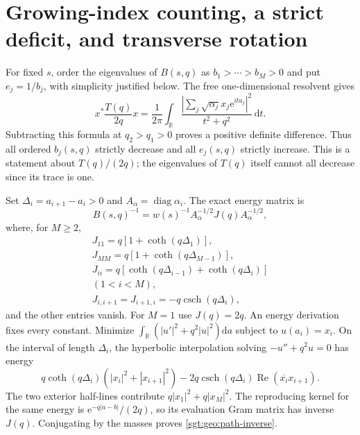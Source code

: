\documentclass[aps,pra,reprint,superscriptaddress,longbibliography]{revtex4-2}
\newcommand{\dd}{\mathrm d}
\newcommand{\ee}{\mathrm e}
\begin{document}
\section{Growing-index counting, a strict deficit, and transverse rotation}
\label{sgt:geo:counting-section}
\label{sgt:geo:structure}

For fixed $s$, order the eigenvalues of $B(s,q)$ as
$b_1>\cdots>b_M>0$ and put $e_j=1/b_j$, with simplicity justified
below.  The free one-dimensional resolvent gives
\begin{equation}
 x^*\frac{T(q)}{2q}x
 =\frac1{2\pi}\int_{\mathbb R}
 \frac{|\sum_j\sqrt{\alpha_j}x_j\ee^{ita_j}|^2}{t^2+q^2}\,\dd t.
 \label{sgt:geo:free-resolvent}
\end{equation}
Subtracting this formula at $q_2>q_1>0$ proves a positive definite
difference.  Thus all ordered $b_j(s,q)$ strictly decrease and all
$e_j(s,q)$ strictly increase.  This is a statement about $T(q)/(2q)$;
the eigenvalues of $T(q)$ itself cannot all decrease since its trace
is one.

Set $\Delta_i=a_{i+1}-a_i>0$ and $A_\alpha=\operatorname{diag}\alpha_i$.
The exact energy matrix is
\begin{equation}
 B(s,q)^{-1}=w(s)^{-1}A_\alpha^{-1/2}J(q)A_\alpha^{-1/2},
 \label{sgt:geo:path-inverse}
\end{equation}
where, for $M\geq2$,
\begin{gather*}
 J_{11}=q[1+\coth(q\Delta_1)],\\
 J_{MM}=q[1+\coth(q\Delta_{M-1})],\\
 J_{ii}=q[\coth(q\Delta_{i-1})+\coth(q\Delta_i)]\\
(1<i<M),\\
 J_{i,i+1}=J_{i+1,i}=-q\operatorname{csch}(q\Delta_i),
\end{gather*}
and the other entries vanish.  For $M=1$ use $J(q)=2q$.
An energy derivation fixes every constant.  Minimize
$\int_{\mathbb R}(|u'|^2+q^2|u|^2)\dd a$ subject to $u(a_i)=x_i$.
On the interval of length $\Delta_i$, the hyperbolic interpolation
solving $-u''+q^2u=0$ has energy
\[
 q\coth(q\Delta_i)(|x_i|^2+|x_{i+1}|^2)
 -2q\operatorname{csch}(q\Delta_i)
                 \operatorname{Re}(\overline{x_i}x_{i+1}).
\]
The two exterior half-lines contribute $q|x_1|^2+q|x_M|^2$.
The reproducing kernel for the same energy is
$\ee^{-q|a-b|}/(2q)$, so its evaluation Gram matrix has inverse $J(q)$.
Conjugating by the masses proves \eqref{sgt:geo:path-inverse}.
\end{document}
